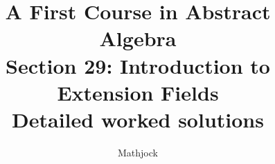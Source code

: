 
\title{\textbf{A First Course in Abstract Algebra}\\[0.3em]Section 29: Introduction to Extension Fields\\[0.3em]\large Detailed worked solutions}
\author{Mathjock}
\date{}

\maketitle
\bookinfo
\tableofcontents
\clearpage
\renewcommand{\thesection}{29}
\renewcommand{\theHsection}{fraleigh.29}


